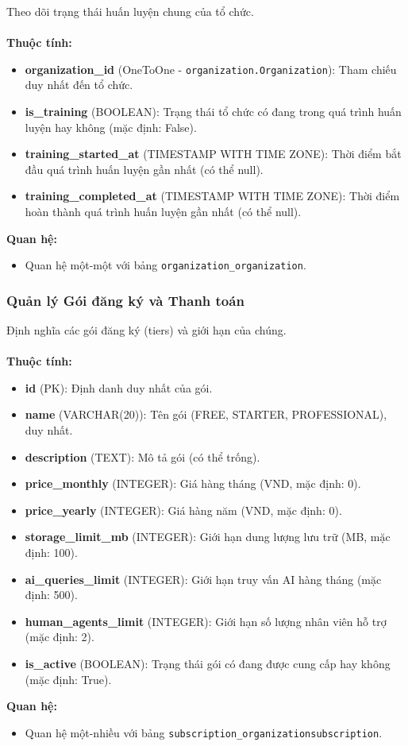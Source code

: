  Theo dõi trạng thái huấn luyện chung của tổ chức. \\\\
\indent\textbf{Thuộc tính:}
\begin{itemize}
    \item \textbf{organization\_id} (OneToOne - \texttt{organization.Organization}): Tham chiếu duy nhất đến tổ chức.
    \item \textbf{is\_training} (BOOLEAN): Trạng thái tổ chức có đang trong quá trình huấn luyện hay không (mặc định: False).
    \item \textbf{training\_started\_at} (TIMESTAMP WITH TIME ZONE): Thời điểm bắt đầu quá trình huấn luyện gần nhất (có thể null).
    \item \textbf{training\_completed\_at} (TIMESTAMP WITH TIME ZONE): Thời điểm hoàn thành quá trình huấn luyện gần nhất (có thể null).
\end{itemize}
\textbf{Quan hệ:}
\begin{itemize}
    \item Quan hệ một-một với bảng \texttt{organization\_organization}.
\end{itemize}

\subsubsection{Quản lý Gói đăng ký và Thanh toán}

 Định nghĩa các gói đăng ký (tiers) và giới hạn của chúng. \\\\
\indent\textbf{Thuộc tính:}
\begin{itemize}
    \item \textbf{id} (PK): Định danh duy nhất của gói.
    \item \textbf{name} (VARCHAR(20)): Tên gói (FREE, STARTER, PROFESSIONAL), duy nhất.
    \item \textbf{description} (TEXT): Mô tả gói (có thể trống).
    \item \textbf{price\_monthly} (INTEGER): Giá hàng tháng (VND, mặc định: 0).
    \item \textbf{price\_yearly} (INTEGER): Giá hàng năm (VND, mặc định: 0).
    \item \textbf{storage\_limit\_mb} (INTEGER): Giới hạn dung lượng lưu trữ (MB, mặc định: 100).
    \item \textbf{ai\_queries\_limit} (INTEGER): Giới hạn truy vấn AI hàng tháng (mặc định: 500).
    \item \textbf{human\_agents\_limit} (INTEGER): Giới hạn số lượng nhân viên hỗ trợ (mặc định: 2).
    \item \textbf{is\_active} (BOOLEAN): Trạng thái gói có đang được cung cấp hay không (mặc định: True).
\end{itemize}
\textbf{Quan hệ:}
\begin{itemize}
    \item Quan hệ một-nhiều với bảng \texttt{subscription\_organizationsubscription}.
\end{itemize}

